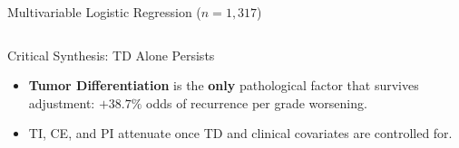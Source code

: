 \documentclass[10pt,aspectratio=169,xcolor={table,dvipsnames}]{beamer}
\begin{document}
\begin{frame}{Multivariable Logistic Regression ($n=1,317$)}
\begin{columns}[c]
      \begin{alertblock}{Critical Synthesis: TD Alone Persists}
        \begin{itemize}\setlength{\itemsep}{1pt}
          \item \textbf{Tumor Differentiation} is the \textbf{only} pathological factor that survives adjustment: $+38.7\%$ odds of recurrence per grade worsening.
          \item TI, CE, and PI attenuate once TD and clinical covariates are controlled for.
        \end{itemize}
      \end{alertblock}
  \end{columns}
\end{frame}

\end{document}
